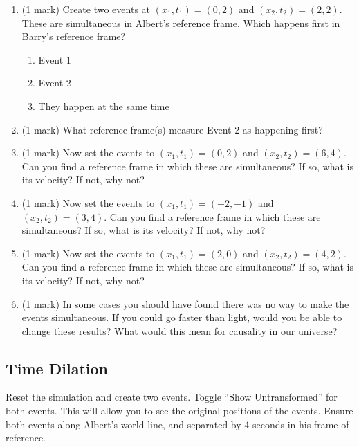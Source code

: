 \documentclass{article}
\begin{document}
\begin{enumerate}
\item (1 mark) Create two events at $(x_1,t_1)=(0,2)$ and $(x_2,t_2)=(2,2)$. These are simultaneous in Albert's reference frame. Which happens first in Barry's reference frame?
\begin{enumerate}
\item Event 1
\item Event 2
\item They happen at the same time
\end{enumerate}
\item (1 mark) What reference frame(s) measure Event 2 as happening first?
\vspace{2cm}

\item (1 mark) Now set the events to $(x_1,t_1)=(0,2)$ and $(x_2,t_2)=(6,4)$. Can you find a reference frame in which these are simultaneous? If so, what is its velocity? If not, why not?
\vspace{4cm}
\item (1 mark) Now set the events to $(x_1,t_1)=(-2,-1)$ and $(x_2,t_2)=(3,4)$. Can you find a reference frame in which these are simultaneous? If so, what is its velocity? If not, why not?
\vspace{4cm}
\item (1 mark) Now set the events to $(x_1,t_1)=(2,0)$ and $(x_2,t_2)=(4,2)$. Can you find a reference frame in which these are simultaneous? If so, what is its velocity? If not, why not?
\vspace{4cm}
\item (1 mark) In some cases you should have found there was no way to make the events simultaneous. If you could go faster than light, would you be able to change these results? What would this mean for causality in our universe?
\vspace{4cm}
\end{enumerate}


\subsection*{Time Dilation}
Reset the simulation and create two events. Toggle ``Show Untransformed'' for both events. This will allow you to see the original positions of the events. Ensure both events along Albert's world line, and separated by 4 seconds in his frame of reference.
\end{document}
